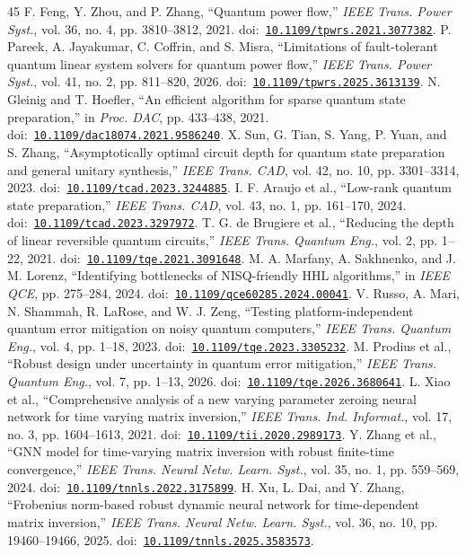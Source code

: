 \documentclass{ieeeaccess}
\newcommand{\refdoi}[1]{doi:~\href{https://doi.org/#1}{\nolinkurl{#1}}}
\begin{document}
\begin{thebibliography}{45}
 F. Feng, Y. Zhou, and P. Zhang, ``Quantum power flow,'' \emph{IEEE Trans. Power Syst.}, vol. 36, no. 4, pp. 3810--3812, 2021. \refdoi{10.1109/tpwrs.2021.3077382}.
 P. Pareek, A. Jayakumar, C. Coffrin, and S. Misra, ``Limitations of fault-tolerant quantum linear system solvers for quantum power flow,'' \emph{IEEE Trans. Power Syst.}, vol. 41, no. 2, pp. 811--820, 2026. \refdoi{10.1109/tpwrs.2025.3613139}.
 N. Gleinig and T. Hoefler, ``An efficient algorithm for sparse quantum state preparation,'' in \emph{Proc. DAC}, pp. 433--438, 2021. \refdoi{10.1109/dac18074.2021.9586240}.
 X. Sun, G. Tian, S. Yang, P. Yuan, and S. Zhang, ``Asymptotically optimal circuit depth for quantum state preparation and general unitary synthesis,'' \emph{IEEE Trans. CAD}, vol. 42, no. 10, pp. 3301--3314, 2023. \refdoi{10.1109/tcad.2023.3244885}.
 I. F. Araujo et al., ``Low-rank quantum state preparation,'' \emph{IEEE Trans. CAD}, vol. 43, no. 1, pp. 161--170, 2024. \refdoi{10.1109/tcad.2023.3297972}.
 T. G. de Brugiere et al., ``Reducing the depth of linear reversible quantum circuits,'' \emph{IEEE Trans. Quantum Eng.}, vol. 2, pp. 1--22, 2021. \refdoi{10.1109/tqe.2021.3091648}.
 M. A. Marfany, A. Sakhnenko, and J. M. Lorenz, ``Identifying bottlenecks of NISQ-friendly HHL algorithms,'' in \emph{IEEE QCE}, pp. 275--284, 2024. \refdoi{10.1109/qce60285.2024.00041}.
 V. Russo, A. Mari, N. Shammah, R. LaRose, and W. J. Zeng, ``Testing platform-independent quantum error mitigation on noisy quantum computers,'' \emph{IEEE Trans. Quantum Eng.}, vol. 4, pp. 1--18, 2023. \refdoi{10.1109/tqe.2023.3305232}.
 M. Prodius et al., ``Robust design under uncertainty in quantum error mitigation,'' \emph{IEEE Trans. Quantum Eng.}, vol. 7, pp. 1--13, 2026. \refdoi{10.1109/tqe.2026.3680641}.
 L. Xiao et al., ``Comprehensive analysis of a new varying parameter zeroing neural network for time varying matrix inversion,'' \emph{IEEE Trans. Ind. Informat.}, vol. 17, no. 3, pp. 1604--1613, 2021. \refdoi{10.1109/tii.2020.2989173}.
 Y. Zhang et al., ``GNN model for time-varying matrix inversion with robust finite-time convergence,'' \emph{IEEE Trans. Neural Netw. Learn. Syst.}, vol. 35, no. 1, pp. 559--569, 2024. \refdoi{10.1109/tnnls.2022.3175899}.
 H. Xu, L. Dai, and Y. Zhang, ``Frobenius norm-based robust dynamic neural network for time-dependent matrix inversion,'' \emph{IEEE Trans. Neural Netw. Learn. Syst.}, vol. 36, no. 10, pp. 19460--19466, 2025. \refdoi{10.1109/tnnls.2025.3583573}.

\end{thebibliography}
\end{document}

